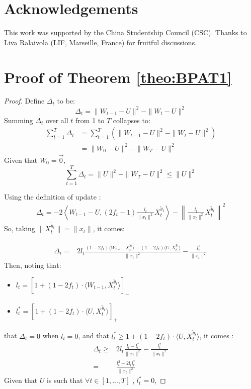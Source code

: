 \documentclass[preprint,12pt,authoryear]{elsarticle}
\begin{document}
\section*{Acknowledgements}

This work was supported by the China Studentship Council (CSC). Thanks to Liva Ralaivola (LIF, Marseille, France) for fruitful discussions.

\appendix
\section{Proof of Theorem \ref{theo:BPAT1}}\label{app:thm1}

\begin{proof}
	Define $\Delta_t$ to be:
	\[\Delta_t = \parallel{W_{t-1}-U}\parallel^2-\parallel{W_t-U}\parallel^2\]
	Summing $\Delta_t$ over all $t$ from 1 to $T$ collapses to:
	\begin{align}
	\sum_{t=1}^{T}\Delta_t &= \sum_{t=1}^{T} \left( \parallel{W_{t-1} - U}\parallel^2-\parallel{W_t - U}\parallel^2 \right)\nonumber\\ 
	&= \parallel{W_0 - U}\parallel^2-\parallel{W_T-U}\parallel^2\nonumber
	\end{align}	
	Given that $W_0 = \vec{0}$, 
	\begin{equation}
	\label{equa:delta}
	\sum_{t=1}^{T}\Delta_t = \parallel{U}\parallel^2 - \parallel{W_T-U}\parallel^2 \leqslant \parallel{U}\parallel^2 
	\end{equation}
	
	Using the definition of update : %
	\begin{align}
	\Delta_t = -2\left\langle W_{t-1} - U, (2f_t-1)\frac{l_t}{\parallel{x_t}\parallel^2}X_t^{\tilde{y}_t}\right\rangle 
	- \left\| \frac{l_t}{\parallel{x_t}\parallel^2}X_t^{\tilde{y}_t}\right\|^2
	\nonumber
	\end{align}
	So, taking $\parallel{X_t^{\tilde{y}_t}}\parallel = \parallel x_t\parallel$, it comes:

	\begin{align}
	\Delta_t =& 2l_t\frac{(1-2f_t)\langle W_{t-1}, X_t^{\tilde{y}_t}\rangle - (1-2f_t)\langle U, X_t^{\tilde{y}_t}\rangle}{\|x_t\|^2}
	-\frac{l_t^2}{\parallel{x_t}\parallel^2}\nonumber
	\end{align}
	Then, noting that:
		\begin{itemize}
			\item[] $l_t = [1+(1-2f_t)\cdot\langle W_{t-1},X_t^{\tilde{y}_t}\rangle]_+$
			\item[] $l_t^{\ast} = [1+(1-2f_t)\cdot\langle U,X_t^{\tilde{y}_t}\rangle]_+$
		\end{itemize}
		that $\Delta_t = 0$ when $l_t = 0$, and that $l^*_t \geq  1+(1-2f_t)\cdot\langle U,X_t^{\tilde{y}_t}\rangle$, it comes : 
	\begin{align}
	\Delta_t\geqslant& 2l_t\frac{l_t - l_t^{\ast}}{\parallel{x_t}\parallel^2}-\frac{l_t^2}{\parallel{x_t}\parallel^2}\nonumber\\
	=& \frac{l_t^2-2l_t l_t^{\ast}}{\parallel x_t\parallel^2}\nonumber
	\end{align}
	Given that $U$ is such that $\forall t \in [1,...,T]$ , $l_t^{\ast} = 0$,
	

\end{proof}
\end{document}
